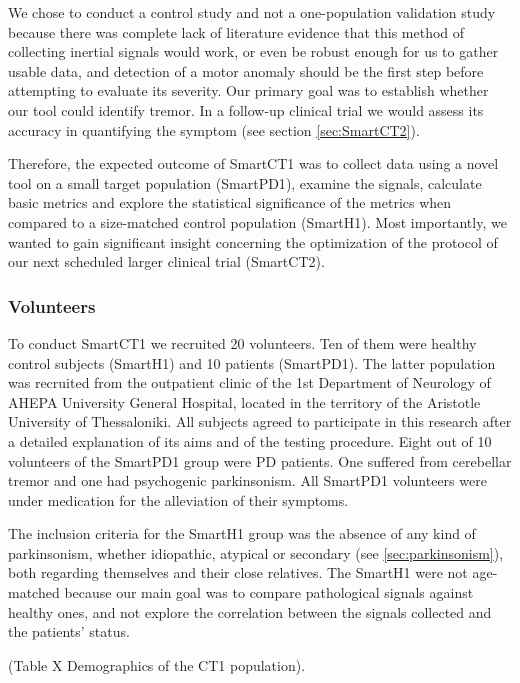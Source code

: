 We chose to conduct a control study and not a one-population validation study because there was complete lack of literature evidence that this method of collecting inertial signals would work, or even be robust enough for us to gather usable data, and detection of a motor anomaly should be the first step before attempting to evaluate its severity. Our primary goal was to establish whether our tool could identify tremor. In a follow-up clinical trial we would assess its accuracy in quantifying the symptom (see section \ref{sec:SmartCT2}). 

Therefore, the expected outcome of \gls{SmartCT1} was to collect data using a novel tool on a small target population (\gls{SmartPD1}), examine the signals, calculate basic metrics and explore the statistical significance of the metrics when compared to a size-matched control population (\gls{SmartH1}). Most importantly, we wanted to gain significant insight concerning the optimization of the protocol of our next scheduled larger clinical trial (\gls{SmartCT2}).

\subsubsection{Volunteers}
\label{subsubsec:smartCT1Volunteers}

To conduct \gls{SmartCT1} we recruited 20 volunteers. Ten of them were healthy control subjects (\gls{SmartH1}) and 10 patients (\gls{SmartPD1}). The latter population was recruited from the outpatient clinic of the 1st Department of Neurology of AHEPA University General Hospital, located in the territory of the Aristotle University of Thessaloniki. All subjects agreed to participate in this research after a detailed explanation of its aims and of the testing procedure. Eight out of 10 volunteers of the \gls{SmartPD1} group were \gls{PD} patients. One suffered from cerebellar tremor and one had psychogenic parkinsonism. All \gls{SmartPD1} volunteers were under medication for the alleviation of their symptoms.

The inclusion criteria for the \gls{SmartH1} group was the absence of any kind of parkinsonism, whether idiopathic, atypical or secondary (see \ref{sec:parkinsonism}), both regarding themselves and their close relatives. The \gls{SmartH1} were not age-matched because our main goal was to compare pathological signals against healthy ones, and not explore the correlation between the signals collected and the patients' status. 

(\textcolor{BurntOrange}{Table X Demographics of the CT1 population}).

